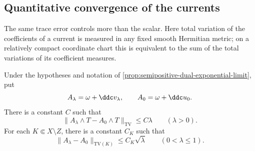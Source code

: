 \subsection{Quantitative convergence of the currents}

The same trace error controls more than the scalar. Here total variation of the coefficients of a current is measured in any fixed smooth Hermitian metric; on a relatively compact coordinate chart this is equivalent to the sum of the total variations of its coefficient measures.

\begin{proposition}\label{prop:semipositive-dual-current-rate}
Under the hypotheses and notation of \cref{prop:semipositive-dual-exponential-limit}, put
\[
 A_\lambda=\omega+\ddc v_\lambda,\qquad
 A_0=\omega+\ddc u_0.
\]
There is a constant $C$ such that
\[
 \|A_\lambda\wedge T-A_0\wedge T\|_{\mathrm{TV}}
       \leq C\lambda\qquad(\lambda>0).
\]
For each $K\Subset X\setminus Z$, there is a constant $C_K$ such that
\[
 \|A_\lambda-A_0\|_{\mathrm{TV}(K)}
       \leq C_K\sqrt\lambda\qquad(0<\lambda\leq1).
\]
\end{proposition}
